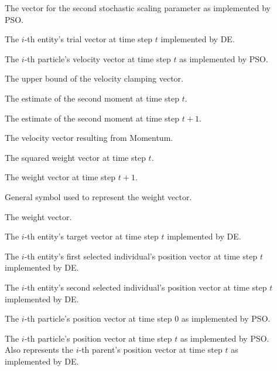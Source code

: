 \begin{description}
	\item [\parbox{2cm}{$\boldsymbol{r}_{2}$}] \parbox{12.5cm}{The vector for the second stochastic scaling parameter as implemented by \acs{PSO}.}
	\item [\parbox{2cm}{$\boldsymbol{u}_{i}(t)$}] \parbox{12.5cm}{The $i$-th entity's trial vector at time step $t$ implemented by \acs{DE}.}
	\item [\parbox{2cm}{$\boldsymbol{v}_{i}(t)$}] \parbox{12.5cm}{The $i$-th particle's velocity vector at time step $t$ as implemented by \acs{PSO}.}
	\item [\parbox{2cm}{$\boldsymbol{V}_{max}$}] \parbox{12.5cm}{The upper bound of the velocity clamping vector.}
	\item [\parbox{2cm}{$\boldsymbol{v}_{t}$}] \parbox{12.5cm}{The estimate of the second moment at time step $t$.}
	\item [\parbox{2cm}{$\boldsymbol{v}_{t+1}$}] \parbox{12.5cm}{The estimate of the second moment at time step $t+1$.}
	\item [\parbox{2cm}{$\boldsymbol{v}$}] \parbox{12.5cm}{The velocity vector resulting from \acs{Momentum}.}
	\item [\parbox{2cm}{$\boldsymbol{w}_{t}^{2}$}] \parbox{12.5cm}{The squared weight vector at time step $t$.}
	\item [\parbox{2cm}{$\boldsymbol{w}_{t+1}$}] \parbox{12.5cm}{The weight vector at time step $t+1$.}
	\item [\parbox{2cm}{$\boldsymbol{w}$}] \parbox{12.5cm}{General symbol used to represent the weight vector.}
	\item [\parbox{2cm}{$\boldsymbol{w}$}] \parbox{12.5cm}{The weight vector.}
	\item [\parbox{2cm}{$\boldsymbol{x}_{i_{1}}(t)$}] \parbox{12.5cm}{The $i$-th entity's target vector at time step $t$ implemented by \acs{DE}.}
	\item [\parbox{2cm}{$\boldsymbol{x}_{i_{2}}(t)$}] \parbox{12.5cm}{The $i$-th entity's first selected individual's position vector at time step $t$ implemented by \acs{DE}.}
	\item [\parbox{2cm}{$\boldsymbol{x}_{i_{3}}(t)$}] \parbox{12.5cm}{The $i$-th entity's second selected individual's position vector at time step $t$ implemented by \acs{DE}.}
	\item [\parbox{2cm}{$\boldsymbol{x}_{i}(0)$}] \parbox{12.5cm}{The $i$-th particle's position vector at time step $0$ as implemented by \acs{PSO}.}
	\item [\parbox{2cm}{$\boldsymbol{x}_{i}(t)$}] \parbox{12.5cm}{The $i$-th particle's position vector at time step $t$ as implemented by \acs{PSO}. Also represents the $i$-th parent's position vector at time step $t$ as implemented by \acs{DE}.}

\end{description}
